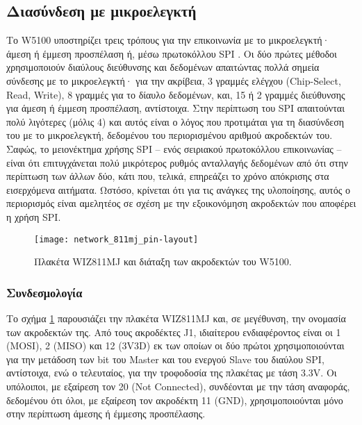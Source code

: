 \subsection{Διασύνδεση με μικροελεγκτή}
\label{subsec:network:interface}

Το W5100 υποστηρίζει τρεις τρόπους για την επικοινωνία με το μικροελεγκτή· άμεση
ή έμμεση προσπέλαση ή, μέσω πρωτοκόλλου SPI \parencite[59]{wiz11:w5100}. Οι δύο
πρώτες μέθοδοι χρησιμοποιούν διαύλους διεύθυνσης και δεδομένων απαιτώντας πολλά
σημεία σύνδεσης με το μικροελεγκτή· για την ακρίβεια, 3 γραμμές ελέγχου
(\textenglish{Chip-Select, Read, Write}), 8 γραμμές για το δίαυλο δεδομένων,
και, 15 ή 2 γραμμές διεύθυνσης για άμεση ή έμμεση προσπέλαση, αντίστοιχα. Στην
περίπτωση του SPI απαιτούνται πολύ λιγότερες (μόλις 4) και αυτός είναι ο λόγος
που προτιμάται για τη διασύνδεση του με το μικροελεγκτή, δεδομένου του
περιορισμένου αριθμού ακροδεκτών του.
Σαφώς, το μειονέκτημα χρήσης SPI -- ενός σειριακού
πρωτοκόλλου επικοινωνίας -- είναι ότι επιτυγχάνεται πολύ μικρότερος ρυθμός
ανταλλαγής δεδομένων από ότι στην περίπτωση των άλλων δύο, κάτι που, τελικά,
επηρεάζει το χρόνο απόκρισης στα εισερχόμενα αιτήματα. Ωστόσο, κρίνεται ότι για
τις ανάγκες της υλοποίησης, αυτός ο περιορισμός είναι αμελητέος σε σχέση με την
εξοικονόμηση ακροδεκτών που αποφέρει η χρήση SPI.

\begin{figure}
    \caption{Πλακέτα WIZ811MJ και διάταξη των ακροδεκτών του W5100.
    \label{fig:network:811mj-pins}}
    \begin{center}
    \texttt{[image: network\_811mj\_pin-layout]}
    \end{center}
\end{figure}


\subsubsection{Συνδεσμολογία}

Το σχήμα \ref{fig:network:811mj-pins} παρουσιάζει την πλακέτα WIZ811MJ και, σε
μεγέθυνση, την ονομασία των ακροδεκτών της. Από τους ακροδέκτες J1, ιδιαίτερου
ενδιαφέροντος είναι οι 1 (MOSI), 2 (MISO) και 12 (3V3D) εκ των οποίων οι δύο
πρώτοι χρησιμοποιούνται για την μετάδοση των bit του \textenglish{Master} και
του ενεργού \textenglish{Slave} του διαύλου SPI, αντίστοιχα, ενώ ο τελευταίος,
για την τροφοδοσία της πλακέτας με τάση 3.3V. Οι υπόλοιποι, με εξαίρεση τον 20
(\textenglish{Not Connected}), συνδέονται με την τάση αναφοράς, δεδομένου ότι
όλοι, με εξαίρεση τον ακροδέκτη 11 (GND), χρησιμοποιούνται μόνο στην περίπτωση
άμεσης ή έμμεσης προσπέλασης.

